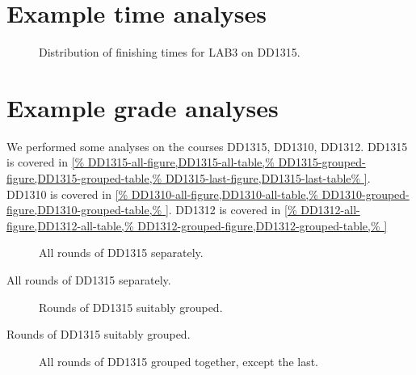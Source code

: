 \mode*

\section{Example time analyses}

\begin{frame}
  \begin{figure}
    
    \caption{Distribution of finishing times for LAB3 on DD1315.}
    \label{DD1315-lab3-time-fig}
  \end{figure}
\end{frame}


\section{Example grade analyses}

We performed some analyses on the courses DD1315, DD1310, DD1312.
DD1315 is covered in \cref{%
  DD1315-all-figure,DD1315-all-table,%
  DD1315-grouped-figure,DD1315-grouped-table,%
  DD1315-last-figure,DD1315-last-table%
}.
DD1310 is covered in \cref{%
  DD1310-all-figure,DD1310-all-table,%
  DD1310-grouped-figure,DD1310-grouped-table,%
}.
DD1312 is covered in \cref{%
  DD1312-all-figure,DD1312-all-table,%
  DD1312-grouped-figure,DD1312-grouped-table,%
}

\begin{frame}
\begin{figure}
\centering

\caption{All rounds of DD1315 separately.}
\label{DD1315-all-figure}
\end{figure}
\end{frame}

\begin{table}
\centering

\caption{All rounds of DD1315 separately.}
\label{DD1315-all-table}
\end{table}

\begin{figure}
\centering

\caption{Rounds of DD1315 suitably grouped.}
\label{DD1315-grouped-figure}
\end{figure}

\begin{table}
\centering

\caption{Rounds of DD1315 suitably grouped.}
\label{DD1315-grouped-table}
\end{table}

\begin{figure}
\centering

\caption{All rounds of DD1315 grouped together, except the last.}
\label{DD1315-last-figure}
\end{figure}

